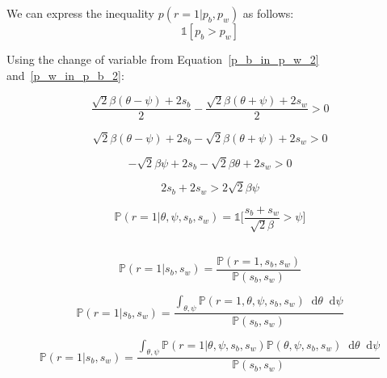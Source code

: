 \documentclass[a4paper,11pt]{article}
\theoremstyle{mytheor}
\newcommand*\diff{\mathop{}\!\mathrm{d}}
\begin{document}
\subsection{}
We can express the inequality $p(r=1|p_b,p_w)$ as follows:
\begin{equation}
    \label{int_p_w_p_b_0}
    \mathbb{1}[p_b > p_w]
\end{equation}

Using the change of variable from Equation~\ref{p_b_in_p_w_2} and~\ref{p_w_in_p_b_2}:

\begin{equation}
    \label{int_p_w_p_b_0}
    \frac{\sqrt{2}\beta(\theta-\psi) + 2s_b}{2} - \frac{\sqrt{2}\beta(\theta+\psi) + 2s_w}{2} > 0
\end{equation}

\begin{equation}
    \label{p_w_and_p_b_in_r_2}
    \sqrt{2}\beta(\theta-\psi) + 2s_b - \sqrt{2}\beta(\theta+\psi) + 2s_w > 0
\end{equation}

\begin{equation}
    \label{p_w_and_p_b_in_r_3}
    -\sqrt{2}\beta\psi + 2s_b - \sqrt{2}\beta\theta + 2s_w > 0
\end{equation}

\begin{equation}
    \label{p_w_and_p_b_in_r_4}
    2s_b + 2s_w > 2\sqrt{2}\beta\psi
\end{equation}

\begin{equation}
    \label{p_w_and_p_b_in_r_5}
    \mathbb{P}(r=1|\theta,\psi,s_b,s_w)=\mathbb{1}\Big[\frac{s_b + s_w}{\sqrt{2}\beta} > \psi\Big]
\end{equation}

\subsection{}

\begin{equation}
    \mathbb{P}(r=1|s_b,s_w) = \frac{\mathbb{P}(r=1,s_b,s_w)}{\mathbb{P}(s_b,s_w)}
\end{equation}

\begin{equation}
    \mathbb{P}(r=1|s_b,s_w) = \frac{\int_{\theta,\psi} \mathbb{P}(r=1,\theta,\psi,s_b,s_w)\diff{\theta}\diff{\psi}}{\mathbb{P}(s_b,s_w)}
\end{equation}

\begin{equation}
    \mathbb{P}(r=1|s_b,s_w) = \frac{\int_{\theta,\psi} \mathbb{P}(r=1|\theta,\psi,s_b,s_w)\mathbb{P}(\theta,\psi,s_b,s_w)\diff{\theta}\diff{\psi}}{\mathbb{P}(s_b,s_w)}
\end{equation}
\end{document}
